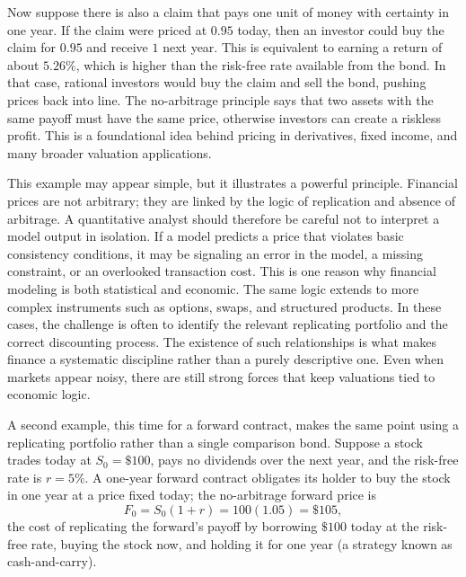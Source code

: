 \documentclass[../ai_in_finance]{subfiles}
\begin{document}
Now suppose there is also a claim that pays one unit of money with certainty in one year. If the claim were priced at $0.95$ today, then an investor could buy the claim for $0.95$ and receive $1$ next year. This is equivalent to earning a return of about $5.26\%$, which is higher than the risk-free rate available from the bond. In that case, rational investors would buy the claim and sell the bond, pushing prices back into line. The no-arbitrage principle says that two assets with the same payoff must have the same price, otherwise investors can create a riskless profit. This is a foundational idea behind pricing in derivatives, fixed income, and many broader valuation applications.

This example may appear simple, but it illustrates a powerful principle. Financial prices are not arbitrary; they are linked by the logic of replication and absence of arbitrage. A quantitative analyst should therefore be careful not to interpret a model output in isolation. If a model predicts a price that violates basic consistency conditions, it may be signaling an error in the model, a missing constraint, or an overlooked transaction cost. This is one reason why financial modeling is both statistical and economic.
The same logic extends to more complex instruments such as options, swaps, and structured products. In these cases, the challenge is often to identify the relevant replicating portfolio and the correct discounting process. The existence of such relationships is what makes finance a systematic discipline rather than a purely descriptive one. Even when markets appear noisy, there are still strong forces that keep valuations tied to economic logic.

A second example, this time for a forward contract, makes the same point using a replicating portfolio rather than a single comparison bond. Suppose a stock trades today at $S_0 = \$100$, pays no dividends over the next year, and the risk-free rate is $r = 5\%$. A one-year forward contract obligates its holder to buy the stock in one year at a price fixed today; the no-arbitrage forward price is
\begin{equation*}
F_0 = S_0(1+r) = 100(1.05) = \$105,
\end{equation*}
the cost of replicating the forward's payoff by borrowing $\$100$ today at the risk-free rate, buying the stock now, and holding it for one year (a strategy known as cash-and-carry).
\end{document}
